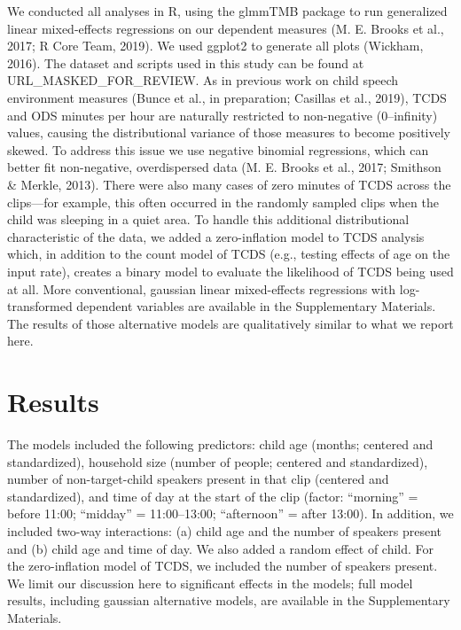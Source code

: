 \documentclass[,man,mask,floatsintext]{apa6}
\begin{document}
We conducted all analyses in R, using the glmmTMB package to run
generalized linear mixed-effects regressions on our dependent measures
(M. E. Brooks et al., 2017; R Core Team, 2019). We used ggplot2 to
generate all plots (Wickham, 2016). The dataset and scripts used in this
study can be found at URL\_MASKED\_FOR\_REVIEW. As in previous work on
child speech environment measures (Bunce et al., in preparation;
Casillas et al., 2019), TCDS and ODS minutes per hour are naturally
restricted to non-negative (0--infinity) values, causing the
distributional variance of those measures to become positively skewed.
To address this issue we use negative binomial regressions, which can
better fit non-negative, overdispersed data (M. E. Brooks et al., 2017;
Smithson \& Merkle, 2013). There were also many cases of zero minutes of
TCDS across the clips---for example, this often occurred in the randomly
sampled clips when the child was sleeping in a quiet area. To handle
this additional distributional characteristic of the data, we added a
zero-inflation model to TCDS analysis which, in addition to the count
model of TCDS (e.g., testing effects of age on the input rate), creates
a binary model to evaluate the likelihood of TCDS being used at all.
More conventional, gaussian linear mixed-effects regressions with
log-transformed dependent variables are available in the Supplementary
Materials. The results of those alternative models are qualitatively
similar to what we report here.

\section{Results}\label{results}

The models included the following predictors: child age (months;
centered and standardized), household size (number of people; centered
and standardized), number of non-target-child speakers present in that
clip (centered and standardized), and time of day at the start of the
clip (factor: \enquote{morning} = before 11:00; \enquote{midday} =
11:00--13:00; \enquote{afternoon} = after 13:00). In addition, we
included two-way interactions: (a) child age and the number of speakers
present and (b) child age and time of day. We also added a random effect
of child. For the zero-inflation model of TCDS, we included the number
of speakers present. We limit our discussion here to significant effects
in the models; full model results, including gaussian alternative
models, are available in the Supplementary Materials.
\end{document}
